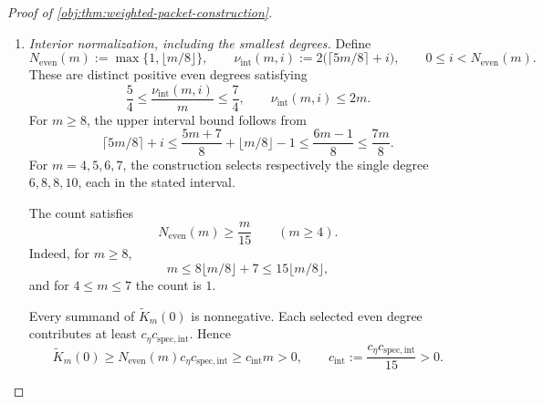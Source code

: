 \begin{proof}[Proof of \cref{obj:thm:weighted-packet-construction}]
\begin{enumerate}
The binomial representation in \cref{obj:lem:jacobi-binomial}, evaluated at zero, gives
\[
\mathsf J_{2s}^{(4,4)}(0)
=
4^{-s}
\sum_{i=0}^{2s}
\binom{2s+4}{i}\binom{2s+4}{2s-i}(-1)^{2s-i}.
\]
The sum is the coefficient of degree \(2s\) in
\((1+z)^{2s+4}(1-z)^{2s+4}=(1-z^2)^{2s+4}\). Therefore
\[
\mathsf J_{2s}^{(4,4)}(0)
=
(-1)^s4^{-s}\binom{2s+4}{s}
\qquad(s\ge0).
\]
In particular, these even-degree center values are nonzero.

Wallis' inequality, in its finite-product form, states
\[
\prod_{i=1}^s\frac{(2i)^2}{(2i-1)(2i+1)}
=
\frac{2^{4s}(s!)^4}{((2s)!)^2(2s+1)}
\le\frac\pi2
\qquad(s\ge0).
\]
The factorial identity
\[
\frac{2^{4s}(s!)^4}{((2s)!)^2(2s+1)}
\left(4^{-s}\binom{2s}{s}\right)^2(2s+1)=1
\]
then gives, for \(s\ge1\),
\[
\left(4^{-s}\binom{2s}{s}\right)^2
\ge\frac2{\pi(2s+1)}
\ge\frac2{3\pi s}.
\]
Since \(\binom{2s+4}{s}\ge\binom{2s}{s}\),
\[
\mathsf J_{2s}^{(4,4)}(0)^2\ge\frac2{3\pi s}.
\]
Together with
\[
0<H_{2s}^{4,4}
\le\frac{C_{\mathrm{norm,int}}}{2s}
\le\frac{C_{\mathrm{norm,int}}}{s},
\]
this proves
\[
\frac{\mathsf J_{2s}^{(4,4)}(0)^2}{H_{2s}^{4,4}}
\ge c_{\mathrm{spec,int}},
\qquad
c_{\mathrm{spec,int}}
:=\frac2{3\pi C_{\mathrm{norm,int}}}>0
\qquad(s\ge1).
\]

\item \emph{Interior normalization, including the smallest degrees.}
Define
\[
N_{\mathrm{even}}(m):=\max\{1,\lfloor m/8\rfloor\},
\qquad
\nu_{\mathrm{int}}(m,i)
:=2\bigl(\lceil5m/8\rceil+i\bigr),
\qquad
0\le i<N_{\mathrm{even}}(m).
\]
These are distinct positive even degrees satisfying
\[
\frac54\le\frac{\nu_{\mathrm{int}}(m,i)}m\le\frac74,
\qquad
\nu_{\mathrm{int}}(m,i)\le2m.
\]
For \(m\ge8\), the upper interval bound follows from
\[
\lceil5m/8\rceil+i
\le\frac{5m+7}{8}+\lfloor m/8\rfloor-1
\le\frac{6m-1}{8}\le\frac{7m}{8}.
\]
For \(m=4,5,6,7\), the construction selects respectively the single degree
\(6,8,8,10\), each in the stated interval.

The count satisfies
\[
N_{\mathrm{even}}(m)\ge\frac m{15}\qquad(m\ge4).
\]
Indeed, for \(m\ge8\),
\[
m\le8\lfloor m/8\rfloor+7
\le15\lfloor m/8\rfloor,
\]
and for \(4\le m\le7\) the count is \(1\).

Every summand of \(\widetilde K_m(0)\) is nonnegative. Each selected even degree contributes at least
\(c_\eta c_{\mathrm{spec,int}}\). Hence
\[
\widetilde K_m(0)
\ge
N_{\mathrm{even}}(m)c_\eta c_{\mathrm{spec,int}}
\ge c_{\mathrm{int}}m>0,
\qquad
c_{\mathrm{int}}
:=\frac{c_\eta c_{\mathrm{spec,int}}}{15}>0.
\]


\end{enumerate}
\end{proof}
